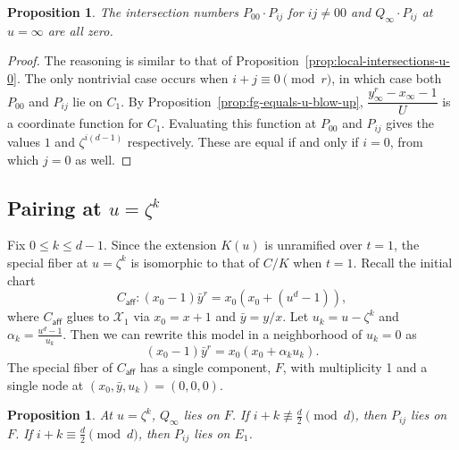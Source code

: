 \documentclass[reqno]{amsart}
\newtheorem{proposition}[thm]{Proposition}
\theoremstyle{definition}
\theoremstyle{remark}
\def\XX{\mathcal{X}}
\def\caff{C_{\textsf{aff}}}
\begin{document}
\begin{proposition}\label{prop:local-intersections-u-infty}
  The intersection numbers $P_{00} \cdot P_{ij}$ for $ij \neq 00$ and $Q_{\infty} \cdot P_{ij}$ at $u = \infty$ are all zero.
\end{proposition}

\begin{proof}
  The reasoning is similar to that of Proposition~\ref{prop:local-intersections-u-0}. The only nontrivial case occurs when $i+j \equiv 0 \pmod{r}$, in which case both $P_{00}$ and $P_{ij}$ lie on $C_1$. By Proposition~\ref{prop:fg-equals-u-blow-up}, $\dfrac{y_\infty^r - x_\infty - 1}{U}$ is a coordinate function for $C_1$. Evaluating this function at $P_{00}$ and $P_{ij}$ gives the values $1$ and $\zeta^{i(d-1)}$ respectively. These are equal if and only if $i = 0$, from which $j = 0$ as well.
\end{proof}

\subsection{Pairing at $u = \zeta^k$}
\label{sec:pairing-at-u-1}

Fix $0 \leq k \leq d-1$. Since the extension $K(u)$ is unramified over $t = 1$, the special fiber at $u = \zeta^k$ is isomorphic to that of $C/K$ when $t = 1$. Recall the initial chart 
\[
\caff: (x_0 - 1) \bar{y}^r = x_0(x_0 + (u^d - 1)),
\]
where $\caff$ glues to $\XX_1$ via $x_0 = x + 1$ and $\bar{y} = y/x$. Let $u_k = u - \zeta^k$ and $\alpha_k = \frac{u^d - 1}{u_k}$. Then we can rewrite this model in a neighborhood of $u_k = 0$ as
\[
(x_0 - 1) \bar{y}^r = x_0(x_0 + \alpha_ku_k).
\]
The special fiber of $\caff$ has a single component, $F$, with multiplicity 1 and a single node at $(x_0, \bar{y}, u_k) = (0,0,0)$.
\begin{proposition}\label{prop:points-on-components-u-zeta-k}
  At $u=\zeta^k$, $Q_\infty$ lies on $F$. If $i+k \not\equiv \frac{d}{2} \pmod{d}$, then $P_{ij}$ lies on $F$. If $i + k \equiv \frac{d}{2} \pmod{d}$, then $P_{ij}$ lies on $E_1$.
\end{proposition}
\end{document}
